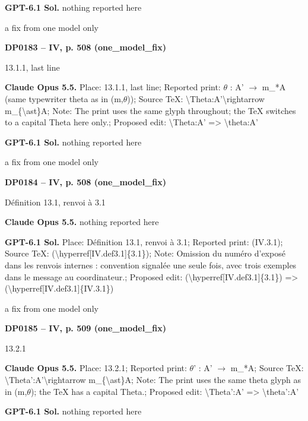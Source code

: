 \textbf{GPT-6.1 Sol.} nothing reported here\par
a fix from one model only\par
\par\noindent\hypertarget{DP0183}{}\textbf{DP0183 -- IV, p. 508 (one\_model\_fix)}\par
13.1.1, last line\par
\textbf{Claude Opus 5.5.} Place: 13.1.1, last line; Reported print: \ensuremath{\theta} : A' \ensuremath{\to} m\_*A (same typewriter theta as in (m,\ensuremath{\theta})); Source TeX: \textbackslash{}Theta:A'\textbackslash{}rightarrow m\_\{\textbackslash{}ast\}A; Note: The print uses the same glyph throughout; the TeX switches to a capital Theta here only.; Proposed edit: \textbackslash{}Theta:A' =\allowbreak > \textbackslash{}theta:A'\par
\textbf{GPT-6.1 Sol.} nothing reported here\par
a fix from one model only\par
\par\noindent\hypertarget{DP0184}{}\textbf{DP0184 -- IV, p. 508 (one\_model\_fix)}\par
Définition 13.1, renvoi à 3.1\par
\textbf{Claude Opus 5.5.} nothing reported here\par
\textbf{GPT-6.1 Sol.} Place: Définition 13.1, renvoi à 3.1; Reported print: (IV.3.1); Source TeX: (\textbackslash{}hyperref[IV.def3.1]\{3.1\}); Note: Omission du numéro d'exposé dans les renvois internes : convention signalée une seule fois, avec trois exemples dans le message au coordinateur.; Proposed edit: (\textbackslash{}hyperref[IV.def3.1]\{3.1\}) =\allowbreak > (\textbackslash{}hyperref[IV.def3.1]\{IV.3.1\})\par
a fix from one model only\par
\par\noindent\hypertarget{DP0185}{}\textbf{DP0185 -- IV, p. 509 (one\_model\_fix)}\par
13.2.1\par
\textbf{Claude Opus 5.5.} Place: 13.2.1; Reported print: \ensuremath{\theta}' : A' \ensuremath{\to} m\_*A; Source TeX: \textbackslash{}Theta':A'\textbackslash{}rightarrow m\_\{\textbackslash{}ast\}A; Note: The print uses the same theta glyph as in (m,\ensuremath{\theta}); the TeX has a capital Theta.; Proposed edit: \textbackslash{}Theta':A' =\allowbreak > \textbackslash{}theta':A'\par
\textbf{GPT-6.1 Sol.} nothing reported here\par
